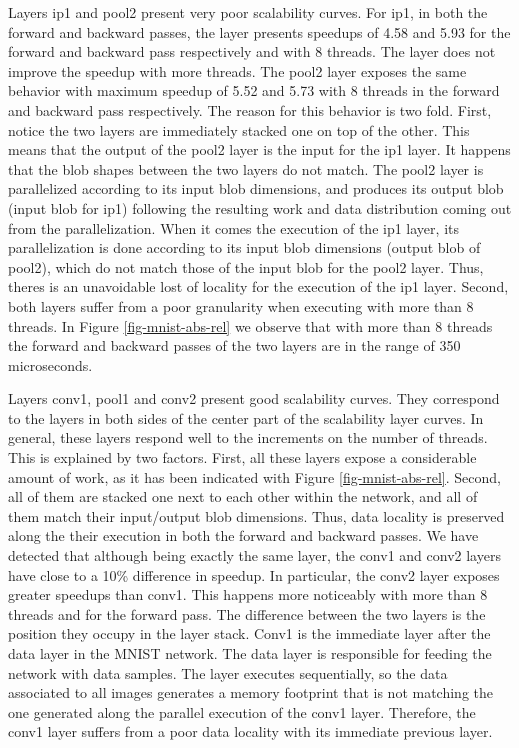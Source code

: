 Layers ip1 and pool2 present very poor scalability curves. 
For ip1, in both the forward and backward passes, the layer 
presents speedups of 4.58 and 5.93 for the forward and backward 
pass respectively and with 8 threads. The layer does not improve 
the speedup with more threads. The pool2 layer exposes the same 
behavior with maximum speedup of 5.52 and 5.73 with 8 threads in 
the forward and backward pass respectively. The reason for this 
behavior is two fold. First, notice the two layers are immediately 
stacked one on top of the other. This means that the 
output of the pool2 layer is the input for the ip1 layer. It happens 
that the blob shapes between the two layers do not match. The pool2 
layer is parallelized according to its input blob dimensions, and 
produces its output blob (input blob for ip1) following the resulting 
work and data distribution coming out from the parallelization. When 
it comes the execution of the ip1 layer, its parallelization is done 
according to its input blob dimensions (output blob of pool2), which do 
not match those of the input blob for the pool2 layer. Thus, theres is 
an unavoidable lost of locality for the execution of the ip1 layer. 
Second, both layers suffer from a poor granularity when executing with 
more than 8 threads. In Figure \ref{fig-mnist-abs-rel} we observe that 
with more than 8 threads the forward and backward passes of the two layers 
are in the range of 350 microseconds.

Layers conv1, pool1 and conv2 present good scalability curves. They 
correspond to the layers in both sides of the center part of the 
scalability layer curves. In general, these layers respond well to the 
increments on the number of threads. This is explained by two factors. 
First, all these layers expose a considerable amount of work, as it has 
been indicated with Figure \ref{fig-mnist-abs-rel}. Second, all of them 
are stacked one next to each other within the network, and all of them 
match their input/output blob dimensions. Thus, data locality is 
preserved along the their execution in both the forward and backward passes.
We have detected that although being exactly the same layer, the conv1 
and conv2 layers have close to a 10\% difference in speedup. 
In particular, the conv2 layer exposes greater speedups than conv1. 
This happens more noticeably with more than 8 threads and for the 
forward pass. The difference between the two layers is the position 
they occupy in the layer stack. Conv1 is the immediate layer after the 
data layer in the MNIST network. The data layer is responsible for
feeding the network with data samples. The layer executes sequentially, 
so the data associated to all images generates a memory footprint that is 
not matching the one generated along the parallel execution of the 
conv1 layer. Therefore, the conv1 layer suffers from a poor data 
locality with its immediate previous layer.

